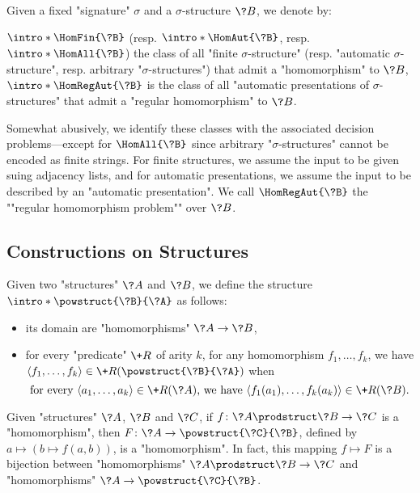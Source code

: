Given a fixed "signature" $\sigma$ and a $\sigma$-structure $\?B$,
we denote by:
\begin{itemize}
	\itemAP $\intro*\HomFin{\?B}$ (resp. $\intro*\HomAut{\?B}$, resp.
	$\intro*\HomAll{\?B}$) the class of all "finite $\sigma$-structure"
	(resp. "automatic $\sigma$-structure", resp. arbitrary "$\sigma$-structures")
	that admit a "homomorphism" to $\?B$,
	\itemAP $\intro*\HomRegAut{\?B}$ is the class of all "automatic presentations of  $\sigma$-structures" that admit a "regular homomorphism" to $\?B$.
\end{itemize}
Somewhat abusively, we identify these classes with the associated decision problems---except
for $\HomAll{\?B}$ since arbitrary "$\sigma$-structures" cannot be encoded as finite strings.
For finite structures, we assume the input to be given suing adjacency lists, and for automatic presentations, we assume the input to be described by an "automatic presentation".
We call $\HomRegAut{\?B}$ the \AP""regular homomorphism problem"" over $\?B$.


\subsection{Constructions on Structures}

Given two "structures" $\?A$ and $\?B$, we define the structure \AP$\intro*\powstruct{\?B}{\?A}$ as follows:
\begin{itemize}
  \item its domain are "homomorphisms" $\?A \to \?B$,
  \item for every "predicate" $\+R$ of arity $k$, for any homomorphism $f_1,\hdots,f_k$,
  we have $\langle f_1,\hdots,f_k\rangle \in \+R(\powstruct{\?B}{\?A})$ when 
  \[
	\text{for every }
	\langle a_1,\hdots,a_k\rangle \in \+R(\?A)
	\text{, we have }
	\langle f_1(a_1), \hdots, f_k(a_k) \rangle \in \+R(\?B).
  \]
\end{itemize}


\begin{proposition}
	\AP\label{prop:currying-hom}
	Given "structures" $\?A$, $\?B$ and $\?C$, if $f\colon \?A\prodstruct \?B \to \?C$
	is a "homomorphism", then $F\colon \?A \to \powstruct{\?C}{\?B}$,
	defined by $a \mapsto (b \mapsto f(a,b))$, is a "homomorphism".
	In fact, this mapping $f \mapsto F$ is a bijection
	between "homomorphisms" $\?A\prodstruct \?B \to \?C$
	and "homomorphisms" $\?A \to \powstruct{\?C}{\?B}$.
\end{proposition}

